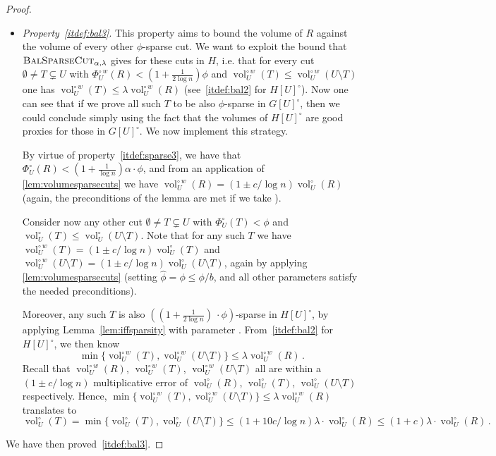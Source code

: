 \documentclass[epsfig,letter,11pt]{article}
\numberwithin{equation}{section}
\newcommand{\unvolc}[2]{\operatorname{vol}_{#2}^\circ (#1)}
\newcommand{\wvolc}[2]{\operatorname{vol}_{#2}^{\circ \,w} (#1)}
\newcommand{\unspc}[2]{\Phi_{#2}^\circ (#1)}
\newcommand{\wspc}[2]{\Phi_{#2}^{\circ \,w} (#1)}
\newcommand{\bsc}{\textsc{BalSparseCut}_{\alpha,\lambda}}
\renewcommand{\hat}{\widehat}
\begin{document}
\begin{proof}[Proof]
\begin{itemize}
		
		
		\item \textit{Property~\eqref{itdef:bal3}}. This property aims to bound the volume of $R$ against the volume of every other $\phi$-sparse cut. We want to exploit the bound that $\bsc$ gives for these cuts in $H$, i.e. that for every cut $\emptyset \neq T \subsetneq U$ with $\wspc{R}{U} <  (1+\frac{1}{2\log n})  \phi$ and $\wvolc{T}{U} \le \wvolc{U \setminus T}{U}$ one has $\wvolc{T}{U} \le \lambda \wvolc{R}{U} $ (see~\eqref{itdef:bal2} for $H[U]^\circ$). Now one can see that if we prove all such $T$ to be also $\phi$-sparse in $G[U]^\circ$, then we could conclude simply using the fact that the volumes of $H[U]^\circ$ are good proxies for those in $G[U]^\circ$. We now implement this strategy.
		
		By virtue of property~\eqref{itdef:sparse3}, we have that $\unspc{R}{U}<(1+\frac{1}{\log n})\alpha \cdot \phi$, and from an application of \cref{lem:volumesparsecuts} we have $\wvolc{R}{U}= (1 \pm c/\log n)\unvolc{R}{U}$ (again, the preconditions of the lemma are met if we take \smash{$\hat{\phi}=(1+\frac{1}{\log n})\alpha \cdot \phi$}).
		
		Consider now any other cut $\emptyset \neq T \subsetneq U$ with $\unspc{T}{U} < \phi$ and $\unvolc{T}{U} \le \unvolc{U \setminus T}{U}$. Note that for any such $T$ we have $\wvolc{T}{U}= (1 \pm c/\log n)\unvolc{T}{U}$ and $\wvolc{U \setminus T}{U}= (1 \pm c/\log n)\unvolc{U \setminus T}{U}$, again by applying \cref{lem:volumesparsecuts} (setting $\hat{\phi} =\phi \le \phi/b$, and all other parameters satisfy the needed preconditions).
		
		Moreover, any such $T$ is also $((1+\frac{1}{2\log n})\ \cdot \phi)$-sparse in $H[U]^\circ$, by applying Lemma~\ref{lem:iffsparsity} with parameter \smash{$\hat{\phi}=(1+\frac{1}{2\log n}) \phi \ge (1+\frac{1}{3\log n}) \phi$}. From~\eqref{itdef:bal2} for $H[U]^\circ$, we then know
		\begin{equation*}
			\min\{\wvolc{T}{U},\wvolc{U \setminus T}{U}\} \le \lambda \wvolc{R}{U} \, .
		\end{equation*}
		Recall that $\wvolc{R}{U}$, $\wvolc{T}{U}$, $\wvolc{U \setminus T}{U}$ all are within a $(1 \pm c/\log n)$ multiplicative error of $\unvolc{R}{U}$, $\unvolc{T}{U}$, $\unvolc{U \setminus T}{U}$ respectively. Hence, $\min\{\wvolc{T}{U},\wvolc{U \setminus T}{U}\} \le \lambda \wvolc{R}{U}$ translates to
		\begin{equation*}
			\unvolc{T}{U} = \min\{\unvolc{T}{U},\unvolc{U \setminus T}{U}\} \le (1+10c/\log n) \lambda\cdot \unvolc{R}{U} \le (1+c) \lambda\cdot \unvolc{R}{U} \, .
		\end{equation*}
	\end{itemize}
	\noindent
	We have then proved~\eqref{itdef:bal3}.
	\end{proof}
\end{document}
